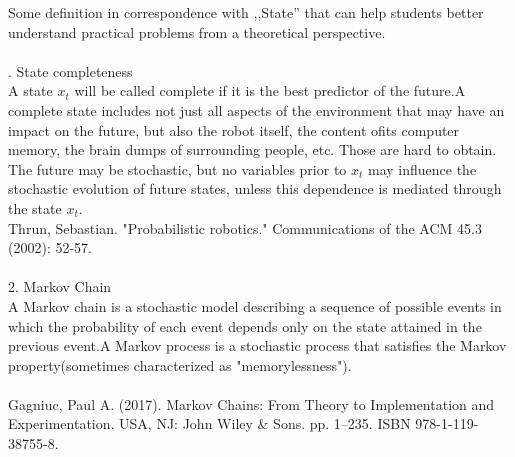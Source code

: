 \documentclass{article}
\begin{document}
Some definition in correspondence with ,,State'' that can help students better understand practical problems from a theoretical perspective.\\
\\
. State completeness\\
A state $x_{t}$ will be called complete if it is the best predictor of the future.A complete state includes not just all aspects of the environment that may have an impact on the future, but also the robot itself, the content ofits computer memory, the brain dumps of surrounding people, etc. Those are hard to obtain.\\
The future may be stochastic, but no variables prior to $x_{t}$  may influence the stochastic evolution of future states, unless this dependence is mediated through the state $x_{t}$.
\\
Thrun, Sebastian. "Probabilistic robotics." Communications of the ACM 45.3 (2002): 52-57.\\
\\
2. Markov Chain\\
A Markov chain is a stochastic model describing a sequence of possible events in which the probability of each event depends only on the state attained in the previous event.A Markov process is a stochastic process that satisfies the Markov property(sometimes characterized as "memorylessness").\\
\\
Gagniuc, Paul A. (2017). Markov Chains: From Theory to Implementation and Experimentation. USA, NJ: John Wiley & Sons. pp. 1–235. ISBN 978-1-119-38755-8.
\end{document}
